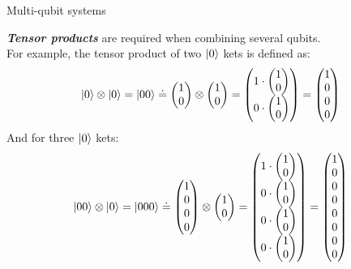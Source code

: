 \documentclass[10pt]{beamer}
\begin{document}
{
\begin{frame}[fragile]{Multi-qubit systems}

\textbf{\emph{Tensor products}} are required when combining several qubits.\\
For example, the tensor product of two $\ket{0}$ kets is defined as:
\begin{equation}
\ket{0} \otimes \ket{0} = \ket{00} \doteq \begin{pmatrix}1\\0\end{pmatrix} \otimes \begin{pmatrix}1\\0\end{pmatrix} = \begin{pmatrix}1\cdot \begin{pmatrix}1\\0\end{pmatrix}\\0\cdot\begin{pmatrix}1\\0\end{pmatrix}\end{pmatrix} = \begin{pmatrix}1\\0\\0\\0\end{pmatrix}
\end{equation}
And for three $\ket{0}$ kets:
\begin{equation}
\ket{00} \otimes \ket{0} = \ket{000} \doteq \begin{pmatrix}1\\0\\0\\0\end{pmatrix} \otimes \begin{pmatrix}1\\0\end{pmatrix} = \begin{pmatrix}1\cdot \begin{pmatrix}1\\0\end{pmatrix}\\0\cdot \begin{pmatrix}1\\0\end{pmatrix}\\0\cdot \begin{pmatrix}1\\0\end{pmatrix}\\0\cdot \begin{pmatrix}1\\0\end{pmatrix}\end{pmatrix} = \begin{pmatrix}1\\0\\0\\0\\0\\0\\0\\0\end{pmatrix}

\end{equation}
\end{frame}}
\end{document}
